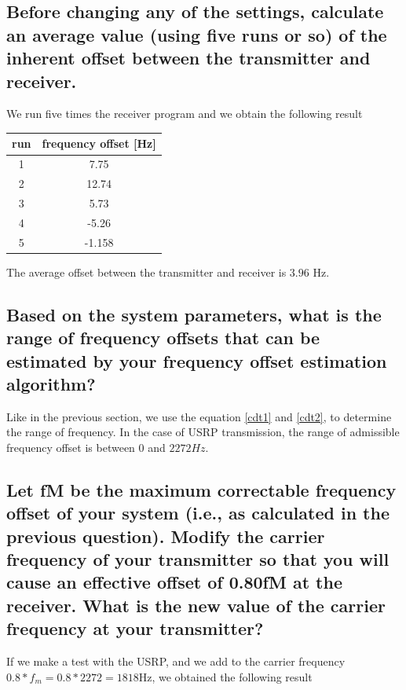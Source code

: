 \documentclass[frenchb, oneside, headings=normal]{scrartcl}
\begin{document}
\subsection{Before changing any of the settings, calculate an average value (using five runs or so) of the inherent offset between the transmitter and receiver.}

We run five times the receiver program and we obtain the following result
 
\begin{center}
	\begin{tabular}{c|c}
		run & frequency offset [\si{\hertz}]\\
		\hline
		1 & 7.75\\
		2 & 12.74\\
		3 & 5.73\\
		4 & -5.26\\
		5 & -1.158\\
	\end{tabular}
\end{center}

The average offset between the transmitter and receiver is $3.96$ \si{\hertz}. 


\subsection{Based on the system parameters, what is the range of frequency offsets that can be estimated by your frequency offset estimation algorithm?}

Like in the previous section, we use the equation \ref{cdt1} and \ref{cdt2}, to determine the range of frequency. In the case of USRP transmission, the range of admissible frequency offset is between $0$ and $2272 Hz$.



\subsection{Let fM be the maximum correctable frequency offset of your system (i.e., as calculated in the previous question). Modify the carrier frequency of your transmitter so that you will cause an effective offset of 0.80fM at the receiver. What is the new value of the carrier frequency at your transmitter?}

If we make a test with the USRP, and we add to the carrier frequency $0.8*f_m=0.8*2272=1818 \si{\hertz}$, we obtained the following result
\end{document}
